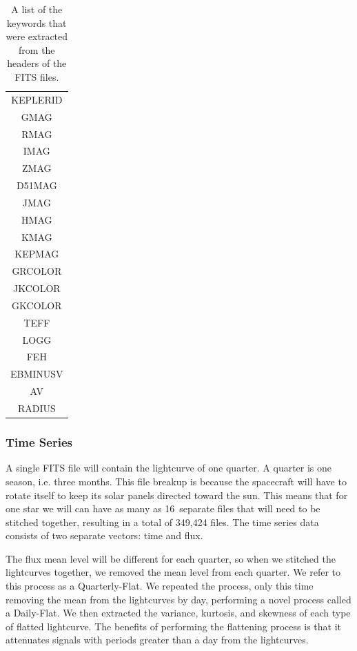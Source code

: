 \documentclass[12pt]{article}
\begin{document}
\begin{table}
    \begin{center}
    \begin{tabular}{|c|}
        \hline
        KEPLERID\\
        GMAG\\
        RMAG\\
        IMAG\\
        ZMAG\\
        D51MAG\\
        JMAG\\
        HMAG\\
        KMAG\\
        KEPMAG\\
        GRCOLOR\\
        JKCOLOR\\
        GKCOLOR\\
        TEFF\\
        LOGG\\
        FEH\\
        EBMINUSV\\
        AV\\
        RADIUS\\
        \hline
    \end{tabular}
    \end{center}
    \caption{A list of the keywords that were extracted from the headers of the FITS files.}
    \label{tab:keywords}
\end{table}

\subsubsection{Time Series}
\label{ssub:Time Series}

A single FITS file will contain the lightcurve of one quarter.
A quarter is one season, i.e. three months.
This file breakup is because the spacecraft will have to rotate itself to keep its solar panels directed toward the sun.
This means that for one star we will can have as many as 16~separate files that will need to be stitched together, resulting in a total of 349,424 files.
The time series data consists of two separate vectors: time and flux.

The flux mean level will be different for each quarter, so when we stitched the lightcurves together, we removed the mean level from each quarter.
We refer to this process as a Quarterly-Flat.
We repeated the process, only this time removing the mean from the lightcurves by day, performing a novel process called a Daily-Flat.
We then extracted the variance, kurtosis, and skewness of each type of flatted lightcurve.
The benefits of performing the flattening process is that it attenuates signals with periods greater than a day from the lightcurves.
\end{document}
